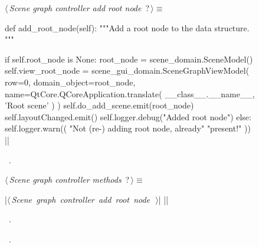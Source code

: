 \documentclass[%
    a4paper,    %
    justified,  %
    nobib,      %
    openany     %
]{tufte-book}
\makeatletter
\renewcommand{\label}[1]{\@tufte@label{##1}}%
\makeatother
\begin{document}
\begin{figure}
\begin{flushleft} \small
\begin{minipage}{\linewidth}\label{scrap27}\raggedright\small
{} $\langle\,${\itshape Scene graph controller add root node}\nobreak\ {\footnotesize {?}}$\,\rangle\equiv$
\vspace{-1ex}
\begin{pythoncode}
def add_root_node(self):
    """Add a root node to the data structure.
    """

    if self.root_node is None:
        root_node = scene_domain.SceneModel()
        self.view_root_node = scene_gui_domain.SceneGraphViewModel(
            row=0,
            domain_object=root_node,
            name=QtCore.QCoreApplication.translate(
                __class__.__name__, 'Root scene'
            )
        )
        self.do_add_scene.emit(root_node)
        self.layoutChanged.emit()
        self.logger.debug("Added root node")
    else:
        self.logger.warn((
            "Not (re-) adding root node, already"
            "present!"
        ))
|\NWsep|
\end{pythoncode}
\vspace{1.5ex}
\footnotesize
\begin{list}{}{\setlength{\itemsep}{-\parsep}\setlength{\itemindent}{-\leftmargin}}
\item \NWtxtMacroRefIn\ .

\item{}
\end{list}
\end{minipage}\vspace{4ex}
\end{flushleft}
\begin{flushleft} \small
\begin{minipage}{\linewidth}\label{scrap28}\raggedright\small
{} $\langle\,${\itshape Scene graph controller methods}\nobreak\ {\footnotesize {?}}$\,\rangle\equiv$
\vspace{-1ex}
\begin{pythoncode}
|\hbox{$\langle\,${\itshape Scene graph controller add root node}\nobreak\ {\footnotesize {}}$\,\rangle$}|
|\NWsep|
\end{pythoncode}
\vspace{1.5ex}
\footnotesize
\begin{list}{}{\setlength{\itemsep}{-\parsep}\setlength{\itemindent}{-\leftmargin}}
\item \NWtxtMacroDefBy\ .
\item \NWtxtMacroRefIn\ .


\end{list}
\end{minipage}
\end{flushleft}
\end{figure}
\end{document}
